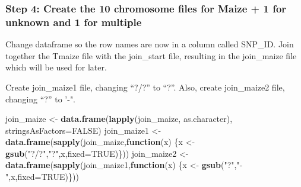 \documentclass[]{article}
\newenvironment{Shaded}{\begin{snugshade}}{\end{snugshade}}
\newcommand{\ControlFlowTok}[1]{\textcolor[rgb]{0.13,0.29,0.53}{\textbf{#1}}}
\newcommand{\DataTypeTok}[1]{\textcolor[rgb]{0.13,0.29,0.53}{#1}}
\newcommand{\KeywordTok}[1]{\textcolor[rgb]{0.13,0.29,0.53}{\textbf{#1}}}
\newcommand{\NormalTok}[1]{#1}
\newcommand{\OperatorTok}[1]{\textcolor[rgb]{0.81,0.36,0.00}{\textbf{#1}}}
\newcommand{\OtherTok}[1]{\textcolor[rgb]{0.56,0.35,0.01}{#1}}
\newcommand{\StringTok}[1]{\textcolor[rgb]{0.31,0.60,0.02}{#1}}
\begin{document}
\begin{Shaded}
\end{Shaded}

\hypertarget{step-4-create-the-10-chromosome-files-for-maize-1-for-unknown-and-1-for-multiple}{%
\subsubsection{Step 4: Create the 10 chromosome files for Maize + 1 for
unknown and 1 for
multiple}\label{step-4-create-the-10-chromosome-files-for-maize-1-for-unknown-and-1-for-multiple}}

Change dataframe so the row names are now in a column called SNP\_ID.
Join together the Tmaize file with the join\_start file, resulting in
the join\_maize file which will be used for later.

Create join\_maize1 file, changing ``?/?'' to ``?''. Also, create
join\_maize2 file, changing ``?'' to '-".

\begin{Shaded}
\begin{Highlighting}[]
\NormalTok{join_maize <-}\StringTok{ }\KeywordTok{data.frame}\NormalTok{(}\KeywordTok{lapply}\NormalTok{(join_maize, as.character),}
                            \DataTypeTok{stringsAsFactors=}\OtherTok{FALSE}\NormalTok{)}
\NormalTok{join_maize1 <-}\StringTok{ }\KeywordTok{data.frame}\NormalTok{(}\KeywordTok{sapply}\NormalTok{(join_maize,}\ControlFlowTok{function}\NormalTok{(x) }
\NormalTok{                  \{x <-}\StringTok{ }\KeywordTok{gsub}\NormalTok{(}\StringTok{"?/?"}\NormalTok{,}\StringTok{"?"}\NormalTok{,x,}\DataTypeTok{fixed=}\OtherTok{TRUE}\NormalTok{)\}))}
\NormalTok{join_maize2 <-}\StringTok{ }\KeywordTok{data.frame}\NormalTok{(}\KeywordTok{sapply}\NormalTok{(join_maize1,}\ControlFlowTok{function}\NormalTok{(x) }
\NormalTok{                  \{x <-}\StringTok{ }\KeywordTok{gsub}\NormalTok{(}\StringTok{"?"}\NormalTok{,}\StringTok{"-"}\NormalTok{,x,}\DataTypeTok{fixed=}\OtherTok{TRUE}\NormalTok{)\}))}
\end{Highlighting}
\end{Shaded}
\end{document}
